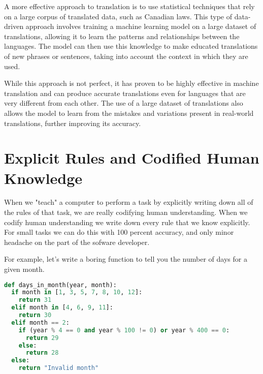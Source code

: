 A more effective approach to translation is to use statistical techniques that rely on a large corpus of translated data, such as Canadian laws. This type of data-driven approach involves training a machine learning model on a large dataset of translations, allowing it to learn the patterns and relationships between the languages. The model can then use this knowledge to make educated translations of new phrases or sentences, taking into account the context in which they are used.

While this approach is not perfect, it has proven to be highly effective in machine translation and can produce accurate translations even for languages that are very different from each other. The use of a large dataset of translations also allows the model to learn from the mistakes and variations present in real-world translations, further improving its accuracy.

\section{Explicit Rules and Codified Human Knowledge}

When we "teach" a computer to perform a task by explicitly writing down all of the rules of that task, we are really codifying human understanding. When we codify human understanding we write down every rule that we know explicitly. For small tasks we can do this with 100 percent accuracy, and only minor headache on the part of the sofware developer. 

For example, let's write a boring function to tell you the number of days for a given month. 

\begin{lstlisting}[language=Python,style=kaolstplain,linewidth=1.5\textwidth]
def days_in_month(year, month):
  if month in [1, 3, 5, 7, 8, 10, 12]:
    return 31
  elif month in [4, 6, 9, 11]:
    return 30
  elif month == 2:
    if (year % 4 == 0 and year % 100 != 0) or year % 400 == 0:
      return 29
    else:
      return 28
  else:
    return "Invalid month"

\end{lstlisting}



